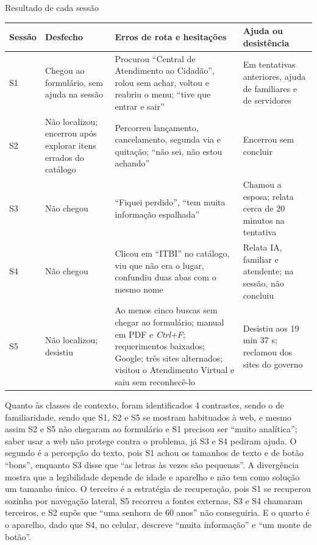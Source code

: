 \documentclass[
  12pt,
  oneside,
  a4paper,
  chapter=TITLE,
  section=TITLE,
  english,
  brazilian
]{abntex2}
\renewcommand{\fonte}[1]{\par\vspace{3pt}{\footnotesize\raggedright\noindent Fonte: #1\par}\vspace{4pt}}%
\begin{document}
\begin{quadro}[!htbp]
  \caption{Resultado de cada sessão}\label{qua:sessoes-res}
  \centering\footnotesize
  \begin{tabularx}{\textwidth}{|P{1.2cm}|P{2.6cm}|Y|Y|}\hline
    Sessão & Desfecho & Erros de rota e hesitações & Ajuda ou desistência \\\hline
    S1 & Chegou ao formulário, sem ajuda na sessão & Procurou ``Central de Atendimento ao Cidadão'', rolou sem achar, voltou e reabriu o menu; ``tive que entrar e sair'' & Em tentativas anteriores, ajuda de familiares e de servidores \\\hline
    S2 & Não localizou; encerrou após explorar itens errados do catálogo & Percorreu lançamento, cancelamento, segunda via e quitação; ``não sei, não estou achando'' & Encerrou sem concluir \\\hline
    S3 & Não chegou & ``Fiquei perdido'', ``tem muita informação espalhada'' & Chamou a esposa; relata cerca de 20 minutos na tentativa \\\hline
    S4 & Não chegou & Clicou em ``ITBI'' no catálogo, viu que não era o lugar, confundiu duas abas com o mesmo nome & Relata IA, familiar e atendente; na sessão, não concluiu \\\hline
    S5 & Não localizou; desistiu & Ao menos cinco buscas sem chegar ao formulário; manual em PDF e \textit{Ctrl+F}; requerimentos baixados; Google; três sites alternados; visitou o Atendimento Virtual e saiu sem reconhecê-lo & Desistiu aos 19 min 37 s; reclamou dos sites do governo \\\hline
  \end{tabularx}
  \fonte{Elaborado pelos autores com base em S1 a S5 (2026).}
\end{quadro}\FloatBarrier

Quanto às classes de contexto, foram identificados 4 contrastes, sendo o de familiaridade, sendo que S1, S2 e S5 se mostram habituados
à web, e mesmo assim S2 e S5 não
chegaram ao formulário e S1 precisou ser ``muito analítica''; saber usar a web não
protege contra o problema, já S3 e S4 pediram ajuda. O
segundo é a percepção do texto, pois S1 achou os tamanhos de texto e de botão
``bons'', enquanto S3 disse que ``as letras às vezes são pequenas''. A divergência
mostra que a legibilidade depende de idade e aparelho e não tem como solução um
tamanho único. O terceiro é a estratégia de recuperação, pois S1 se recuperou
sozinha por navegação lateral, S5 recorreu a fontes externas, S3 e S4 chamaram
terceiros, e S2 supôs que ``uma senhora de 60 anos'' não conseguiria. E o quarto é o aparelho, dado que S4, no celular, descreve ``muita
informação'' e ``um monte de botão''.
\end{document}
